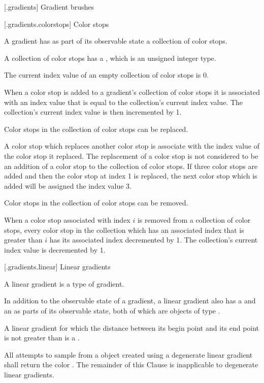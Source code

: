  [\iotwod.gradients] {Gradient brushes}

 [\iotwod.gradients.colorstops] {Color stops}

\pnum
A gradient has as part of its observable state a collection of color stops.

\pnum
A collection of color stops has a , which is an  unsigned integer type.

\pnum
The current index value of an empty collection of color stops is 0.

\pnum
When a color stop is added to a gradient's collection of color stops it is associated with an index value that is equal to the collection's current index value. The collection's current index value is then incremented by 1.

\pnum
Color stops in the collection of color stops can be replaced.

\pnum
A color stop which replaces another color stop is associate with the index value of the color stop it replaced. The replacement of a color stop is not considered to be an addition of a color stop to the collection of color stops.
\enterexample
If three color stops are added and then the color stop at index 1 is replaced, the next color stop which is added will be assigned the index value 3.
\exitexample

\pnum
Color stops in the collection of color stops can be removed.

\pnum
When a color stop associated with index $i$ is removed from a collection of color stops, every color stop in the collection which has an associated index that is greater than $i$ has its associated index decremented by 1. The collection's current index value is decremented by 1.

 [\iotwod.gradients.linear] {Linear gradients}

\pnum
A linear gradient is a type of gradient.

\pnum
In addition to the observable state of a gradient, a linear gradient also has a  and an  as parts of its observable state, both of which are objects of type .

\pnum
A linear gradient for which the distance between its begin point and its end point is not greater than  is a .

\pnum
All attempts to sample from a  object created using a degenerate linear gradient shall return the color . The remainder of this Clause is inapplicable to degenerate linear gradients.

